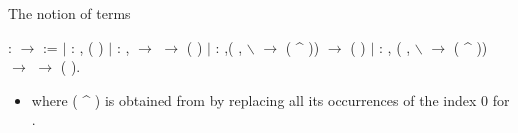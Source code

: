 \documentclass[10pt]{beamer}
\begin{document}
\begin{frame}[fragile]{The notion of terms}

  \begin{coqdoccode}
    \coqdocemptyline \coqdocnoindent {}
     :  \ensuremath{\rightarrow}
     :=\coqdoceol \coqdocindent{1.00em} \ensuremath{|}
     : \coqdockw{\ensuremath{\forall}}
    ,  (
    )\coqdoceol \coqdocindent{1.00em} \ensuremath{|}
     : \coqdockw{\ensuremath{\forall}}
     , 
    \ensuremath{\rightarrow}  
    \ensuremath{\rightarrow} \coqdoceol \coqdocindent{9.00em}
     ( 
    )\coqdoceol \coqdocindent{1.00em} \ensuremath{|}
     : \coqdockw{\ensuremath{\forall}}
     ,(\coqdockw{\ensuremath{\forall}}
    ,  $\backslash$
     \ensuremath{\rightarrow} 
    ( \^{} ))
    \ensuremath{\rightarrow}\coqdoceol \coqdocindent{18.00em}
     ( )\coqdoceol
    \coqdocindent{1.00em} \ensuremath{|}  :
    \coqdockw{\ensuremath{\forall}}  
    , (\coqdockw{\ensuremath{\forall}} ,
     $\backslash$ 
    \ensuremath{\rightarrow}  ( \^{}
    )) \ensuremath{\rightarrow}\coqdoceol
    \coqdocindent{12.00em}  
    \ensuremath{\rightarrow}  (
     ).\coqdoceol
  \end{coqdoccode}

  \begin{itemize}
  \item where ( \^{} ) is obtained from
     by replacing all its occurrences of the index 0 for
    .
  \end{itemize}
\end{frame}
\end{document}
